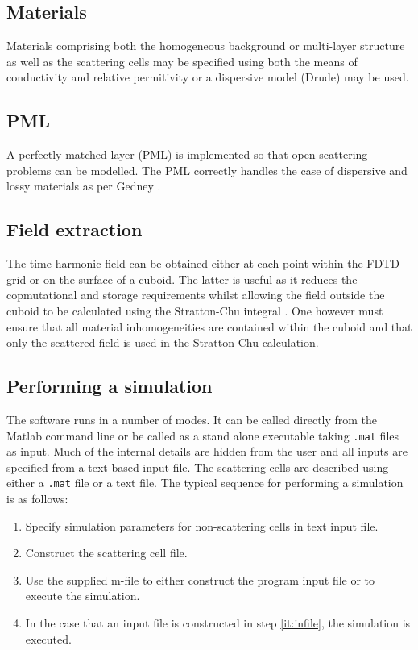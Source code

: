 \documentclass[a4paper, 12pt]{article}
\begin{document}
	\subsection{Materials}
	Materials comprising both the homogeneous background or multi-layer
	structure as well as the scattering cells may be specified using
	both the means of conductivity and relative permitivity or a
	dispersive model (Drude) may be used.

	\subsection{PML}
	A perfectly matched layer (PML) is implemented so that open scattering
	problems can be modelled. The PML correctly handles the case of
	dispersive and lossy materials as per Gedney
	\cite{gedney96electromagnetics399,gedney96ieeetransantprop1630}.

	\subsection{Field extraction}
	The time harmonic field can be obtained either at each point within
	the FDTD grid or on the surface of a cuboid. The latter is useful as
	it reduces the copmutational and storage requirements whilst allowing
	the field outside the cuboid to be calculated using the Stratton-Chu
	integral \cite{poggio73book,stratton39pr99}. One however must ensure
	that all material inhomogeneities are contained within the cuboid and
	that only the scattered field is used in the Stratton-Chu calculation.


	\subsection{Performing a simulation}
	The software runs in a number of modes. It can be called directly from
	the Matlab command line or be called as a stand alone executable
	taking \verb+.mat+ files as input. Much of the internal details are
	hidden from the user and all inputs are specified from a text-based
	input file. The scattering cells are described using either a
	\verb+.mat+ file or a text file. The typical sequence for performing a
	simulation is as follows:
	\begin{enumerate}
		\item Specify simulation parameters for non-scattering cells in text
		input file.
		\item Construct the scattering cell file.
		\item Use the supplied m-file to either construct the program input
		file or to execute the simulation.\label{it:infile}
		\item In the case that an input file is constructed in step
		\ref{it:infile}, the simulation is executed.
	\end{enumerate}
\end{document}
